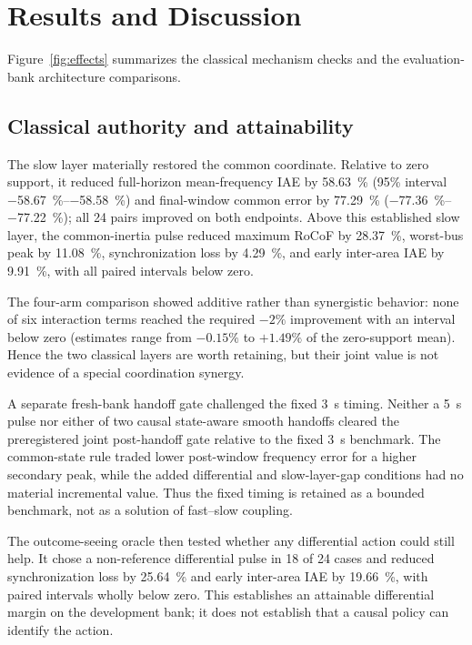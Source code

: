 \documentclass[conference,a4paper]{IEEEtran}
\begin{document}
\section{Results and Discussion}

Figure~\ref{fig:effects} summarizes the classical mechanism checks and the
evaluation-bank architecture comparisons.

\subsection{Classical authority and attainability}

The slow layer materially restored the common coordinate. Relative to zero
support, it reduced full-horizon mean-frequency IAE by
\SI{58.63}{\percent} (95\% interval
\SIrange{-58.67}{-58.58}{\percent}) and final-window common error by
\SI{77.29}{\percent}
(\SIrange{-77.36}{-77.22}{\percent}); all 24 pairs improved on both endpoints.
Above this established slow layer, the common-inertia pulse reduced maximum
RoCoF by \SI{28.37}{\percent}, worst-bus peak by
\SI{11.08}{\percent}, synchronization loss by \SI{4.29}{\percent}, and early
inter-area IAE by \SI{9.91}{\percent}, with all paired intervals below zero.

The four-arm comparison showed additive rather than synergistic behavior:
none of six interaction terms reached the required \(-2\%\) improvement with an
interval below zero (estimates range from \(-0.15\%\) to \(+1.49\%\) of the
zero-support mean). Hence the two classical layers are worth retaining, but
their joint value is not evidence of a special coordination synergy.

A separate fresh-bank handoff gate challenged the fixed \SI{3}{s} timing.
Neither a \SI{5}{s} pulse nor either of two causal state-aware smooth handoffs
cleared the preregistered joint post-handoff gate relative to the fixed
\SI{3}{s} benchmark. The common-state rule traded lower post-window frequency
error for a higher secondary peak, while the added differential and
slow-layer-gap conditions had no material incremental value. Thus the fixed
timing is retained as a bounded benchmark, not as a solution of fast--slow
coupling.

The outcome-seeing oracle then tested whether any differential action could
still help. It chose a non-reference differential pulse in 18 of 24
cases and reduced synchronization loss by \SI{25.64}{\percent} and early
inter-area IAE by \SI{19.66}{\percent}, with paired intervals wholly below
zero. This establishes an attainable differential margin on the development
bank; it does not establish that a causal policy can identify the action.
\end{document}
